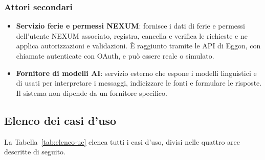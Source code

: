 \documentclass[documento]{gpt}
\begin{document}
\subsubsection{Attori secondari}
\begin{itemize}
  \item \textbf{Servizio ferie e permessi NEXUM}: fornisce i dati di ferie e
        permessi dell'utente NEXUM associato, registra, cancella e verifica le
        richieste e ne applica autorizzazioni e validazioni. È raggiunto tramite
        le API di Eggon, con chiamate autenticate con OAuth, e può essere reale o
        simulato.
  \item \textbf{Fornitore di modelli AI}: servizio esterno che espone i modelli
        linguistici e di  usati per interpretare i messaggi,
        indicizzare le fonti e formulare le risposte. Il sistema non dipende da
        un fornitore specifico.
\end{itemize}

\subsection{Elenco dei casi d'uso}
La Tabella~\ref{tab:elenco-uc} elenca tutti i casi d'uso, divisi nelle quattro
aree descritte di seguito.
\end{document}
